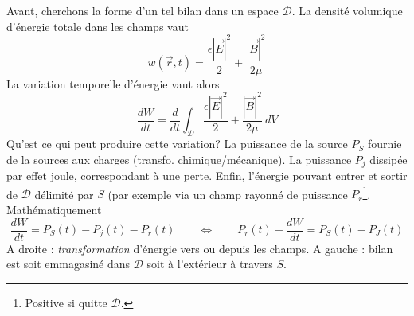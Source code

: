 Avant, cherchons la forme d'un tel bilan dans un espace $\mathcal{D}$. La densité volumique 
d'énergie totale dans les champs vaut
\begin{equation}
w(\vec{r},t) = \dfrac{\epsilon|\vec{E}|^2}{2}+\dfrac{|\vec{B}|^2}{2\mu}
\end{equation}
La variation temporelle d'énergie vaut alors
\begin{equation}
\dfrac{dW}{dt} = \dfrac{d}{dt}\int_\mathcal{D}\dfrac{\epsilon|\vec{E}|^2}{2}+\dfrac{|\vec{B}|^2}{2\mu}
\ dV
\end{equation} 
Qu'est ce qui peut produire cette variation? La puissance de la source $P_S$ fournie de la sources 
aux charges (transfo. chimique/mécanique). La puissance $P_j$ dissipée par effet joule, correspondant 
à une perte. Enfin, l'énergie pouvant entrer et sortir de $\mathcal{D}$ délimité par $S$ (par exemple 
via un champ rayonné de puissance $P_r$\footnote{Positive si quitte $\mathcal{D}$.}. Mathématiquement
\begin{equation}
\dfrac{dW}{dt} = P_S(t)-P_j(t)-P_r(t)\qquad\Leftrightarrow\qquad P_r(t)+\dfrac{dW}{dt} = P_S(t)-P_J(t)
\end{equation}
A droite : \textit{transformation}	d'énergie vers ou depuis les champs. A gauche : bilan est soit 
emmagasiné dans $\mathcal{D}$ soit à l'extérieur à travers $S$.
	
